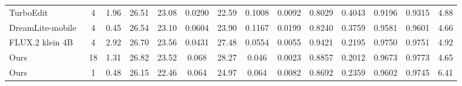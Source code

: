 \begin{table}[!t]
\begin{tabular*}{\textwidth}{@{\extracolsep{\fill}}lc*{12}{c}@{}}
        TurboEdit~\cite{turboedit2024} & 4 & 1.96 & 26.51 & 23.08 & 0.0290 & 22.59 & 0.1008 & 0.0092 & 0.8029 & 0.4043 & 0.9196 & 0.9315 & 4.88 \\
        DreamLite-mobile~\cite{dreamlite2026} & 4 & 0.45 & 26.54 & 23.10 & 0.0604 & 23.90 & 0.1167 & 0.0199 & 0.8240 & 0.3759 & 0.9581 & 0.9601 & 4.66 \\
        FLUX.2 klein 4B~\cite{flux2klein2026} & 4 & 2.92 & 26.70 & 23.56 & 0.0431 & 27.48 & 0.0554 & 0.0055 & 0.9421 & 0.2195 & 0.9750 & 0.9751 & 4.92 \\
        \midrule
        Ours & 18 & 1.31 & 26.82 & 23.52 & 0.068 & 28.27 & 0.046 & 0.0023 & 0.8857 & 0.2012 & 0.9673 & 0.9773 & 4.65 \\
        Ours & 1 & 0.48 & 26.15 & 22.46 & 0.064 & 24.97 & 0.064 & 0.0082 & 0.8692 & 0.2359 & 0.9602 & 0.9745 & 6.41 \\
        \bottomrule
    \end{tabular*}
\end{table}
